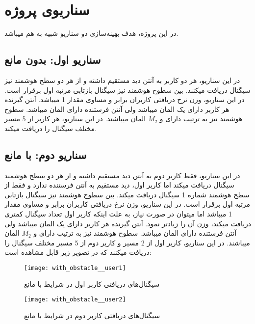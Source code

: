 \begin{itemize}
\end{itemize}

\section{سناریوی پروژه}
در این پروژه، هدف بهینه‌سازی دو سناریو شبیه به هم میباشد. 
\subsection{سناریو اول: بدون مانع}
در این سناریو، هر دو کاربر به آنتن دید مستقیم داشته و از هر دو سطح هوشمند نیز سیگنال دریافت میکنند. بین سطوح هوشمند نیز سیگنال بازتابی مرتبه اول برقرار است. در این سناریو، وزن نرخ دریافتی کاربران برابر و مساوی مقدار 1 میباشد. آنتن گیرنده هر کاربر دارای یک المان میباشد ولی آنتن فرستنده دارای  المان میباشد. سطوح هوشمند نیز به ترتیب دارای  و $M_2$ المان میباشند. در این سناریو، هر کاربر از 5 مسیر مختلف سیگنال را دریافت میکند.


\subsection{سناریو دوم: با مانع}
در این سناریو، فقط کاربر دوم به آنتن دید مستقیم داشته و از هر دو سطح هوشمند سیگنال دریافت میکند اما کاربر اول، دید مستقیم به آنتن فرستنده ندارد و فقط از سطح هوشمند شماره 1 سیگنال دریافت میکند. بین سطوح هوشمند نیز سیگنال بازتابی مرتبه اول برقرار است. در این سناریو، وزن نرخ دریافتی کاربران برابر و مساوی مقدار 1 میباشد اما میتوان در صورت نیاز، به علت اینکه کاربر اول تعداد سیگنال کمتری دریافت میکند، وزن آن را زیادتر نمود. آنتن گیرنده هر کاربر دارای یک المان میباشد ولی آنتن فرستنده دارای  المان میباشد. سطوح هوشمند نیز به ترتیب دارای  و $M_2$ المان میباشند. در این سناریو، کاربر اول از 2 مسیر و کاربر دوم از 5 مسیر مختلف سیگنال را دریافت میکنند که در تصویر زیر قابل مشاهده است:
\begin{figure}[!h]
	\centering
	\texttt{[image: with\_obstacle\_\_user1]}
	
	\caption[سیگنال‌های دریافتی کاربر اول در شرایط با مانع]{
	سیگنال‌های دریافتی کاربر اول در شرایط با مانع
	}
\end{figure}

\begin{figure}[!h]
	\centering
	\texttt{[image: with\_obstacle\_\_user2]}
	
	\caption[سیگنال‌های دریافتی کاربر دوم در شرایط با مانع]{
		سیگنال‌های دریافتی کاربر دوم در شرایط با مانع
	}
\end{figure}
\newpage
